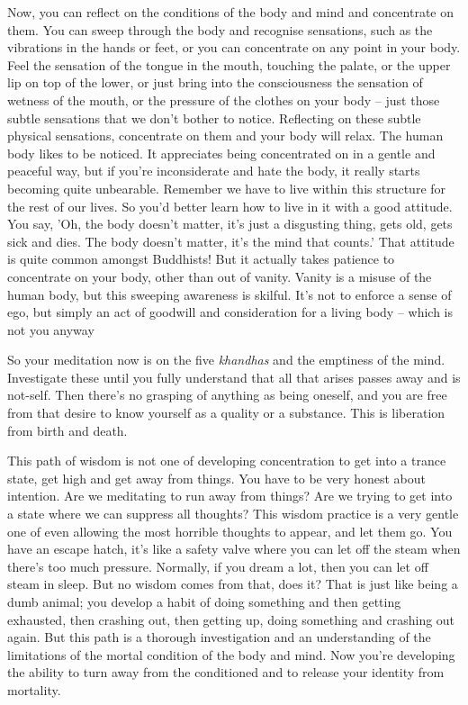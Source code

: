 Now, you can reflect on the conditions of the body and mind and concentrate on them. You can sweep through the body and recognise sensations, such as the vibrations in the hands or feet, or you can concentrate on any point in your body. Feel the sensation of the tongue in the mouth, touching the palate, or the upper lip on top of the lower, or just bring into the consciousness the sensation of wetness of the mouth, or the pressure of the clothes on your body -- just those subtle sensations that we don't bother to notice. Reflecting on these subtle physical sensations, concentrate on them and your body will relax. The human body likes to be noticed. It appreciates being concentrated on in a gentle and peaceful way, but if you're inconsiderate and hate the body, it really starts becoming quite unbearable. Remember we have to live within this structure for the rest of our lives. So you'd better learn how to live in it with a good attitude. You say, 'Oh, the body doesn't matter, it's just a disgusting thing, gets old, gets sick and dies. The body doesn't matter, it's the mind that counts.' That attitude is quite common amongst Buddhists! But it actually takes patience to concentrate on your body, other than out of vanity. Vanity is a misuse of the human body, but this sweeping awareness is skilful. It's not to enforce a sense of ego, but simply an act of goodwill and consideration for a living body -- which is not you anyway 

So your meditation now is on the five \textit{khandhas} and the emptiness of the mind. Investigate these until you fully understand that all that arises passes away and is not-self. Then there's no grasping of anything as being oneself, and you are free from that desire to know yourself as a quality or a substance. This is liberation from birth and death.

This path of wisdom is not one of developing concentration to get into a trance state, get high and get away from things. You have to be very honest about intention. Are we meditating to run away from things? Are we trying to get into a state where we can suppress all thoughts? This wisdom practice is a very gentle one of even allowing the most horrible thoughts to appear, and let them go. You have an escape hatch, it's like a safety valve where you can let off the steam when there's too much pressure. Normally, if you dream a lot, then you can let off steam in sleep. But no wisdom comes from that, does it? That is just like being a dumb animal; you develop a habit of doing something and then getting exhausted, then crashing out, then getting up, doing something and crashing out again. But this path is a thorough investigation and an understanding of the limitations of the mortal condition of the body and mind. Now you're developing the ability to turn away from the conditioned and to release your identity from mortality.

